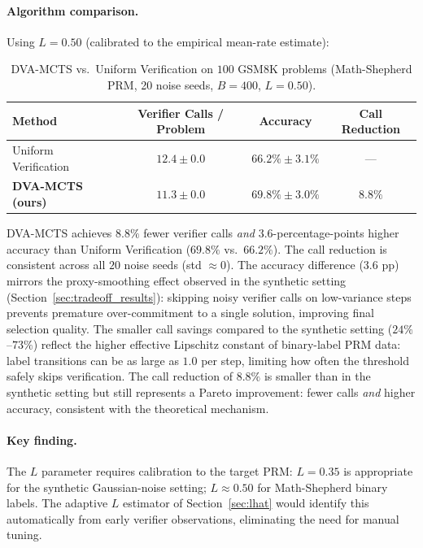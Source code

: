 \paragraph{Algorithm comparison.}
Using $L{=}0.50$ (calibrated to the empirical mean-rate estimate):

\begin{table}[t]
\centering
\caption{DVA-MCTS vs.\ Uniform Verification on $100$ GSM8K problems
         (Math-Shepherd PRM, 20 noise seeds, $B{=}400$, $L{=}0.50$).}
\label{tab:gsm8k}
\begin{tabular}{lccc}
\toprule
Method & Verifier Calls / Problem & Accuracy & Call Reduction \\
\midrule
Uniform Verification       & $12.4 \pm 0.0$ & $66.2\%\pm 3.1\%$ & --- \\
\textbf{DVA-MCTS (ours)}   & $11.3 \pm 0.0$ & $69.8\%\pm 3.0\%$ & $\mathbf{8.8\%}$ \\
\bottomrule
\end{tabular}
\end{table}

DVA-MCTS achieves $\mathbf{8.8\%}$ fewer verifier calls \emph{and} $3.6$-percentage-points
higher accuracy than Uniform Verification ($69.8\%$ vs.\ $66.2\%$). The call reduction
is consistent across all $20$ noise seeds (std $\approx 0$). The accuracy difference
($3.6$ pp) mirrors the proxy-smoothing effect observed in the synthetic setting
(Section~\ref{sec:tradeoff_results}): skipping noisy verifier calls on low-variance steps
prevents premature over-commitment to a single solution, improving final selection quality.
The smaller call savings compared to the synthetic setting ($24\%$--$73\%$)
reflect the higher effective Lipschitz constant of binary-label PRM data: label
transitions can be as large as $1.0$ per step, limiting how often the threshold
safely skips verification.  The call reduction of $8.8\%$ is smaller than in the
synthetic setting but still represents a Pareto improvement: fewer calls \emph{and}
higher accuracy, consistent with the theoretical mechanism.

\paragraph{Key finding.}
The $L$ parameter requires calibration to the target PRM: $L{=}0.35$ is appropriate
for the synthetic Gaussian-noise setting; $L{\approx}0.50$ for Math-Shepherd binary
labels. The adaptive $L$ estimator of Section~\ref{sec:lhat} would identify this
automatically from early verifier observations, eliminating the need for manual tuning.

